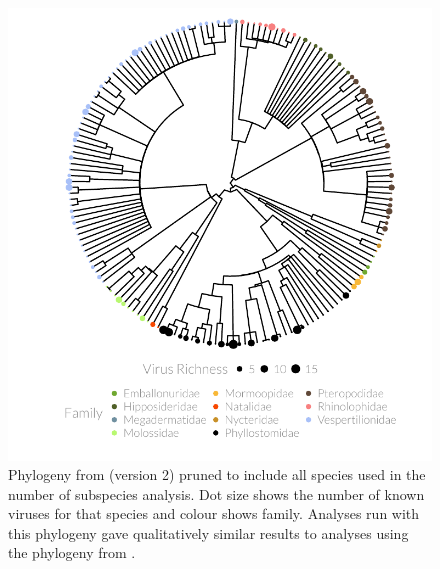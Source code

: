 

























\begin{knitrout}\footnotesize
{}\color{fgcolor}\begin{figure}[t]

{\centering \includegraphics[width=1\textwidth,trim = 0cm 0cm 0cm 0cm]{figures/A-treePlot2-1} 

}

\caption[Pruned alternative phylogeny with dot size showing number of pathogens and colour showing family.]{
Phylogeny from \cite{jones2005bats} (version 2) pruned to include all species used in the number of subspecies analysis.
Dot size shows the number of known viruses for that species and colour shows family.
Analyses run with this phylogeny gave qualitatively similar results to analyses using the phylogeny from \cite{bininda2007delayed}.
}\label{fig:treePlot2}
\end{figure}


\end{knitrout}

